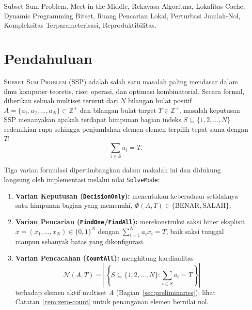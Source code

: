 \documentclass[journal,onecolumn,11pt]{IEEEtran}
\begin{document}
\begin{IEEEkeywords}
Subset Sum Problem, Meet-in-the-Middle, Rekayasa Algoritma, Lokalitas Cache, Dynamic Programming Bitset, Ruang Pencarian Lokal, Perturbasi Jumlah-Nol, Kompleksitas Terparameterisasi, Reproduktibilitas.
\end{IEEEkeywords}

\section{Pendahuluan}
\label{sec:introduction}

 \textsc{Subset Sum Problem} (SSP) adalah salah satu masalah paling mendasar dalam ilmu komputer teoretis, riset operasi, dan optimasi kombinatorial. Secara formal, diberikan sebuah multiset terurut dari $N$ bilangan bulat positif $A = \{a_1, a_2, \dots, a_N\} \subset \mathbb{Z}^+$ dan bilangan bulat target $T \in \mathbb{Z}^+$, masalah keputusan SSP menanyakan apakah terdapat himpunan bagian indeks $S \subseteq \{1, 2, \dots, N\}$ sedemikian rupa sehingga penjumlahan elemen-elemen terpilih tepat sama dengan $T$:
\begin{equation}
    \sum_{i \in S} a_i = T.
    \label{eq:ssp_core}
\end{equation}

Tiga varian formulasi dipertimbangkan dalam makalah ini dan didukung langsung oleh implementasi melalui nilai \texttt{SolveMode}:
\begin{enumerate}
    \item \textbf{Varian Keputusan (\texttt{DecisionOnly}):} menentukan keberadaan setidaknya satu himpunan bagian yang memenuhi, $\Phi(A, T) \in \{\text{BENAR}, \text{SALAH}\}$.
    \item \textbf{Varian Pencarian (\texttt{FindOne}/\texttt{FindAll}):} merekonstruksi saksi biner eksplisit $x = (x_1, \dots, x_N) \in \{0, 1\}^N$ dengan $\sum_{i=1}^N a_i x_i = T$, baik saksi tunggal maupun sebanyak batas yang dikonfigurasi.
    \item \textbf{Varian Pencacahan (\texttt{CountAll}):} menghitung kardinalitas
    \begin{equation}
        \mathcal{N}(A, T) = \left| \left\{ S \subseteq \{1, 2, \dots, N\} : \sum_{i \in S} a_i = T \right\} \right|
    \end{equation}
    terhadap elemen aktif multiset $A$ (Bagian~\ref{sec:preliminaries}); lihat Catatan~\ref{rem:zero-count} untuk penanganan elemen bernilai nol.
\end{enumerate}
\end{document}
